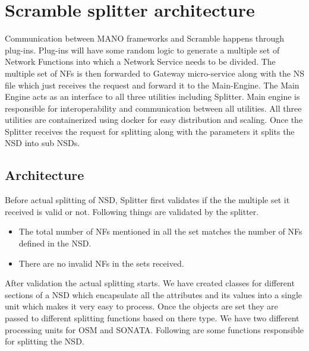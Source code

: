 \chapter{Scramble splitter architecture}
\label{ch:Scramble splitter architecture}

Communication between MANO frameworks and Scramble happens through plug-ins. Plug-ins will have some random logic to generate a multiple set of Network Functions into which a Network Service needs to be divided. The multiple set of NFs is then forwarded to Gateway micro-service along with the NS file which just receives the request and forward it to the Main-Engine. The Main Engine acts as an interface to all three utilities including Splitter. Main engine is responsible for interoperability and communication between all utilities. All three utilities are containerized using docker for easy distribution and scaling. Once the Splitter receives the request for splitting along with the parameters it splits the NSD into sub NSDs.


\section{Architecture}

Before actual splitting of NSD, Splitter first validates if the the multiple set it received is valid or not. Following things are validated by the splitter.
\begin{itemize}
    \item The total number of NFs mentioned in all the set matches the number of NFs defined in the NSD.
    \item There are no invalid NFs in the sets received.
\end{itemize}

After validation the actual splitting starts. We have created classes for different sections of a NSD which encapsulate all the attributes and its values into a single unit which makes it very easy to process. Once the objects are set they are passed to different splitting functions based on there type. We have two different processing units for OSM and SONATA. Following are some functions responsible for splitting the NSD.


